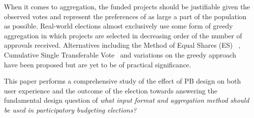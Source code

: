 \documentclass[runningheads]{llncs}
\newcommand{\kibitz}[2]{\ifnum\Comments=1{\color{#1}{#2}}\fi}
\newcommand{\kg}[1]{\kibitz{red}{[Kobi says:#1]}}
\newcommand{\mes}{ES}
\begin{document}
When it comes to aggregation,  the funded projects should be justifiable given the observed votes and represent the preferences of  as large a part of the population as possible. 
Real-world elections almost exclusively use some form of greedy aggregation in which projects are selected in decreasing order of the number of approvals   received.  Alternatives including the Method of Equal Shares (\mes{})~\citep{peters2021proportional} , Cumulative Single Transferable Vote~\citep{skowron2020participatory} and variations on the greedy approach~\citep{talmon2019framework} have been proposed %
but are yet to be of practical significance.



\kg{does this problem statement come too late?}
This paper performs   a comprehensive  study of the effect of PB design on both user experience and the outcome of the election   towards answering the fundamental design question of
\emph{what input format and aggregation method should be used  in participatory budgeting elections?
}




\end{document}
